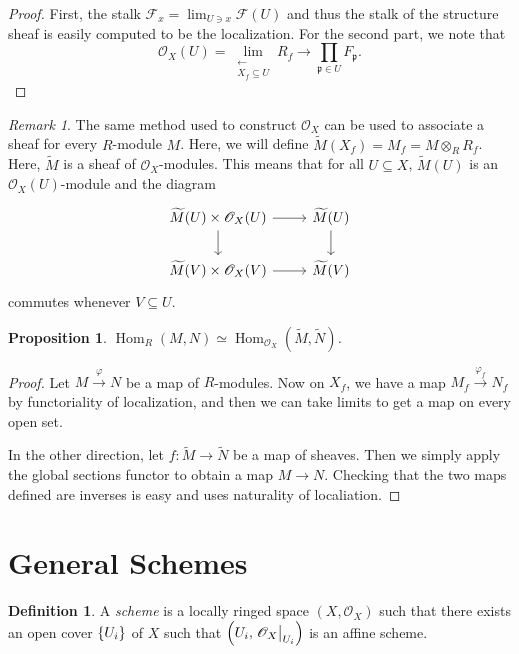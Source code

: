 \documentclass[leqno, openany]{memoir}
\newtheorem{prop}[thm]{Proposition}
\theoremstyle{definition}
\newtheorem{defn}[thm]{Definition}
\theoremstyle{remark}
\newtheorem{rmk}[thm]{Remark}
\theoremstyle{plain}
\theoremstyle{definition}
\theoremstyle{remark}
\newcommand{\mc}[1]{\mathcal{#1}}
\newcommand{\mf}[1]{\mathfrak{#1}}
\newcommand{\msc}[1]{\mathscr{#1}}
\newcommand{\wt}[1]{\widetilde{#1}}
\DeclareMathOperator{\Hom}{Hom}
\begin{document}
\begin{proof}
    First, the stalk $\mc{F}_x = \lim_{U \ni x} \mc{F}(U)$ and thus the stalk of the structure sheaf is easily computed to be the localization. For the second part, we note that
    \[ \msc{O}_X(U) = \lim_{\substack{\longleftarrow \\ X_f \subseteq U}} R_f \longrightarrow \prod_{\mf{p} \in U} F_{\mf{p}}. \]
\end{proof}

\begin{rmk}
    The same method used to construct $\msc{O}_X$ can be used to associate a sheaf for every $R$-module $M$. Here, we will define $\wt{M}(X_f) = M_f = M \otimes_R R_f$. Here, $\wt{M}$ is a sheaf of $\msc{O}_X$-modules. This means that for all $U \subseteq X$, $\wt{M}(U)$ is an $\msc{O}_X(U)$-module and the diagram
    \begin{equation*}
    \begin{tikzcd}
        \wt{M}(U) \times \msc{O}_X(U) \arrow{r} \arrow{d} & \wt{M}(U) \arrow{d} \\
        \wt{M}(V) \times \msc{O}_X(V) \arrow{r} & \wt{M}(V)
    \end{tikzcd}
    \end{equation*}
    commutes whenever $V \subseteq U$.
\end{rmk}

\begin{prop}
    $\Hom_R(M,N) \simeq \Hom_{\msc{O}_X}(\wt{M}, \wt{N})$.
\end{prop}

\begin{proof}
    Let $M \xrightarrow{\varphi} N$ be a map of $R$-modules. Now on $X_f$, we have a map $M_f \xrightarrow{\varphi_f} N_f$ by functoriality of localization, and then we can take limits to get a map on every open set.

    In the other direction, let $f \colon \wt{M} \to \wt{N}$ be a map of sheaves. Then we simply apply the global sections functor to obtain a map $M \to N$. Checking that the two maps defined are inverses is easy and uses naturality of localiation.
\end{proof}

\section{General Schemes}%
\label{sec:general_schemes}

\begin{defn}
    A \textit{scheme} is a locally ringed space $(X, \msc{O}_X)$ such that there exists an open cover $\qty{U_i}$ of $X$ such that $\qty(U_i, \eval{\msc{O}_X}_{U_i})$ is an affine scheme.
\end{defn}
\end{document}

